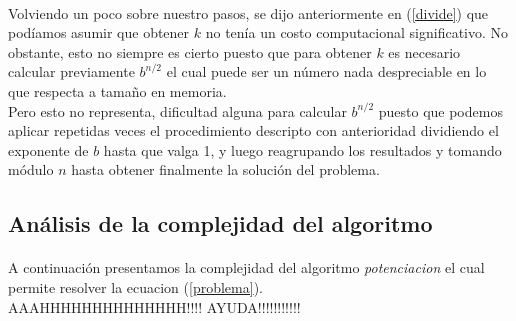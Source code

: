 \paragraph{}
Volviendo un poco sobre nuestro pasos, se dijo anteriormente en (\ref{divide}) que podíamos asumir que obtener $k$ no tenía un costo computacional significativo. No obstante, esto no siempre es cierto puesto que para obtener $k$ es necesario calcular previamente $b^{n/2}$ el cual puede ser un número nada despreciable en lo que respecta a tamaño en memoria.\\
Pero esto no representa, dificultad alguna para calcular $b^{n/2}$ puesto que podemos aplicar repetidas veces el procedimiento descripto con anterioridad dividiendo el exponente de $b$ hasta que valga 1, y luego reagrupando los resultados y tomando módulo $n$ hasta obtener finalmente la solución del problema.\\
 

\subsection{Análisis de la complejidad del algoritmo}

\paragraph{}
A continuación presentamos la complejidad del algoritmo \textit{potenciacion} el cual permite resolver la ecuacion (\ref{problema}). \\

AAAHHHHHHHHHHHHHH!!!! AYUDA!!!!!!!!!!!\\

\incmargin{1em}
\linesnumbered
{}

